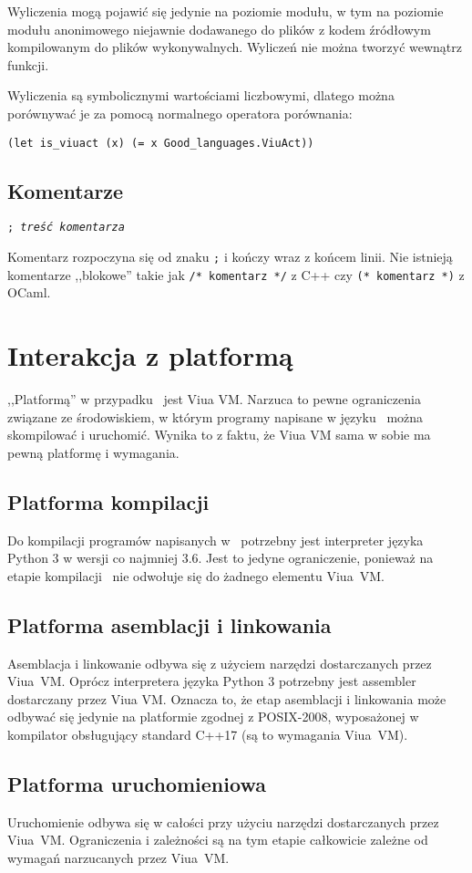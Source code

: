 Wyliczenia mogą pojawić się jedynie na poziomie modułu, w tym na poziomie modułu anonimowego niejawnie
dodawanego do plików z kodem źródłowym kompilowanym do plików wykonywalnych. Wyliczeń nie można tworzyć
wewnątrz funkcji.

Wyliczenia są symbolicznymi wartościami liczbowymi, dlatego można porównywać je
za pomocą normalnego operatora porównania:

\begin{lstlisting}
(let is_viuact (x) (= x Good_languages.ViuAct))
\end{lstlisting}

\subsection{Komentarze}

\texttt{; \emph{treść komentarza}}
\newline

Komentarz rozpoczyna się od znaku \texttt{;} i kończy wraz z końcem linii.
Nie istnieją komentarze ,,blokowe'' takie jak \texttt{/* komentarz */} z C++ czy
\texttt{(* komentarz *)} z OCaml.



\section{Interakcja z platformą}

,,Platformą'' w przypadku \ViuAct\ jest Viua VM. Narzuca to pewne ograniczenia
związane ze środowiskiem, w którym programy napisane w języku \ViuAct\ można
skompilować i uruchomić. Wynika to z faktu, że Viua VM sama w sobie ma pewną
platformę i wymagania.

\subsection{Platforma kompilacji}

Do kompilacji programów napisanych w \ViuAct\ potrzebny jest interpreter języka
Python 3 w wersji co najmniej 3.6. Jest to jedyne ograniczenie, ponieważ na
etapie kompilacji \ViuAct\ nie odwołuje się do żadnego elementu Viua~VM.

\subsection{Platforma asemblacji i linkowania}

Asemblacja i linkowanie odbywa się z użyciem narzędzi dostarczanych przez
Viua~VM. Oprócz interpretera języka Python 3 potrzebny jest assembler
dostarczany przez Viua VM. Oznacza to, że etap asemblacji i linkowania może
odbywać się jedynie na platformie zgodnej z POSIX-2008, wyposażonej w kompilator
obsługujący standard C++17 (są to wymagania Viua~VM).

\subsection{Platforma uruchomieniowa}

Uruchomienie odbywa się w całości przy użyciu narzędzi dostarczanych przez
Viua~VM. Ograniczenia i zależności są na tym etapie całkowicie zależne od
wymagań narzucanych przez Viua~VM.
